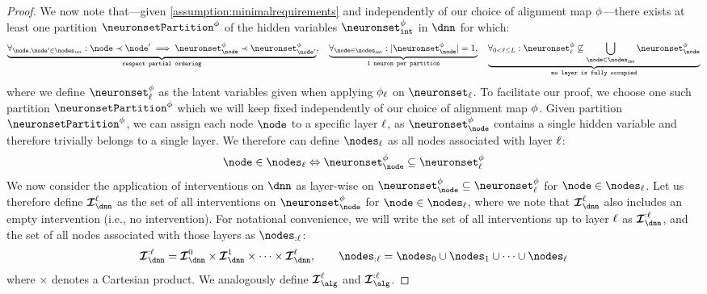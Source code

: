 \begin{proof}
    
    We now note that---given \cref{assumption:minimalrequirements} and independently of our choice of alignment map $\phi$---there exists at least one partition $\neuronsetPartition^{\causalmap}$ of the hidden variables $\neuronsetintcausal$ in $\dnn$ for which:
    \begin{align}
        \underbrace{
        \forall_{\node, \node' \in \nodesint}:
        \node \partialsmall \node' \implies \neuronset^{\causalmap}_{\node} \partialsmall \neuronset^{\causalmap}_{\node'}}_{\texttt{respect partial ordering}},
        \quad
        \underbrace{
        \forall_{\node \in \nodesint}:
        |\neuronset^{\causalmap}_{\node}| = 1,}_{\texttt{1 neuron per partition}}
        \quad
        \underbrace{
        \forall_{0 < \layer \leq \nlayers}:
        \neuronset^{\causalmap}_{\layer} \not\subseteq \bigcup_{\node \in \nodesint} \neuronset^{\causalmap}_{\node}}_{\texttt{no layer is fully occupied}}
    \end{align}
    where we define $\neuronset^\causalmap_\layer$ as the latent variables given when applying $\phi_\ell$ on $\neuronset_\layer$. 
    To facilitate our proof, we choose one such partition $\neuronsetPartition^{\causalmap}$ which we will keep fixed independently of our choice of alignment map $\phi$.
    Given partition $\neuronsetPartition^{\causalmap}$, we can assign each node $\node$ to a specific layer $\ell$, as $\neuronset^{\causalmap}_{\node} $ contains a single hidden variable and therefore trivially belongs to a single layer.
    We therefore can define $\nodes_\layer$ as all nodes associated with layer $\ell$:
    \begin{align}
        \node\in\nodes_\layer\Leftrightarrow\neuronset^{\causalmap}_{\node}\subseteq\neuronset^\causalmap_\layer
    \end{align}
    We now consider the application of interventions on  $\dnn$ as layer-wise on $\neuronset^{\causalmap}_{\node}\subseteq\neuronset^\causalmap_\layer$ for $\node\in\nodes_\layer$.
    Let us therefore define $\interventionsset^\layer_\dnn$ as the set of all interventions
    on $\neuronset^{\causalmap}_{\node}$ for $\node\in\nodes_\layer$, where we note that $\interventionsset^\layer_\dnn$ also includes an empty intervention (i.e., no intervention). 
    For notational convenience, we will write the set of all interventions up to layer $\ell$ as $\interventionsset^{:\layer}_\dnn$, and the set of all nodes associated with those layers as $\nodes_{:\layer}$:
    \begin{align}
        \interventionsset^{:\layer}_\dnn=\interventionsset^{0}_\dnn \times \interventionsset^{1}_\dnn \times \cdots \times \interventionsset^{\layer}_\dnn,
        \qquad
        \nodes_{:\layer} = \nodes_{0} \cup \nodes_{1} \cup \cdots \cup \nodes_{\layer}
    \end{align}
    where $\times$ denotes a Cartesian product.
    We analogously define $\interventionsset^{\layer}_\alg$ and $\interventionsset^{:\layer}_\alg$.


\end{proof}
